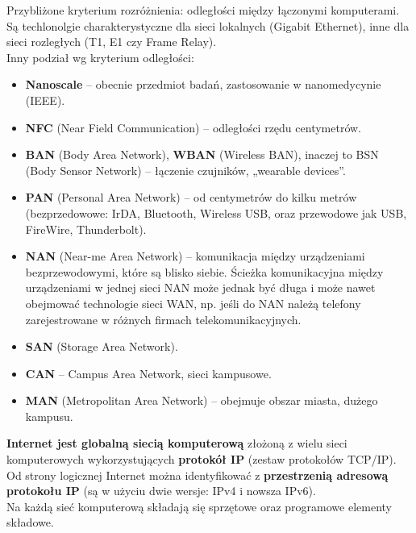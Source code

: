 \documentclass[a4paper]{article}
\begin{document}
Przybliżone  kryterium	 rozróżnienia: odległości między łączonymi	komputerami. Są techlonolgie charakterystyczne dla
sieci	lokalnych (Gigabit Ethernet),	inne dla sieci rozległych (T1,	E1	czy	Frame	Relay).
\\
Inny podział wg kryterium odległości:
\begin{itemize}
    \item \textbf{Nanoscale} – obecnie przedmiot badań, zastosowanie w nanomedycynie (IEEE).
    \item \textbf{NFC} (Near Field Communication) – odległości	rzędu	centymetrów.
    \item \textbf{BAN} (Body Area Network),	\textbf{WBAN} (Wireless	BAN),	inaczej to	BSN	(Body	Sensor	Network) – łączenie	czujników,	„wearable	devices”.
    \item \textbf{PAN} (Personal Area Network) – od centymetrów	do	kilku metrów (bezprzedowowe: IrDA,	Bluetooth,	Wireless USB,	oraz	przewodowe	jak	USB,	FireWire,
Thunderbolt).
    \item \textbf{NAN} (Near-me	Area	Network)	– komunikacja	między	urządzeniami bezprzewodowymi, które	są	blisko	siebie. Ścieżka	komunikacyjna	między	urządzeniami	w	jednej	sieci	NAN	może jednak	być	długa	i	może	nawet	obejmować	technologie	sieci	WAN,	np.	jeśli	do	NAN	należą telefony	zarejestrowane	w	różnych	firmach	telekomunikacyjnych.
    \item \textbf{SAN} (Storage	Area	Network).
    \item \textbf{CAN} – Campus	Area	Network,	sieci	kampusowe.
    \item \textbf{MAN} (Metropolitan	Area	Network)	– obejmuje	obszar	miasta,	dużego	kampusu.
\end{itemize}

\textbf{Internet jest globalną	 siecią	 komputerową} złożoną z	 wielu	 sieci	 komputerowych wykorzystujących	 \textbf{protokół IP} (zestaw protokołów TCP/IP). Od strony	 logicznej	 Internet można	identyfikować	z	\textbf{przestrzenią	adresową	protokołu	IP}	 (są	w użyciu	dwie wersje:	IPv4 i nowsza IPv6).\\
Na	każdą	sieć	komputerową	składają	się	sprzętowe	oraz	programowe	elementy	składowe.
\end{document}
